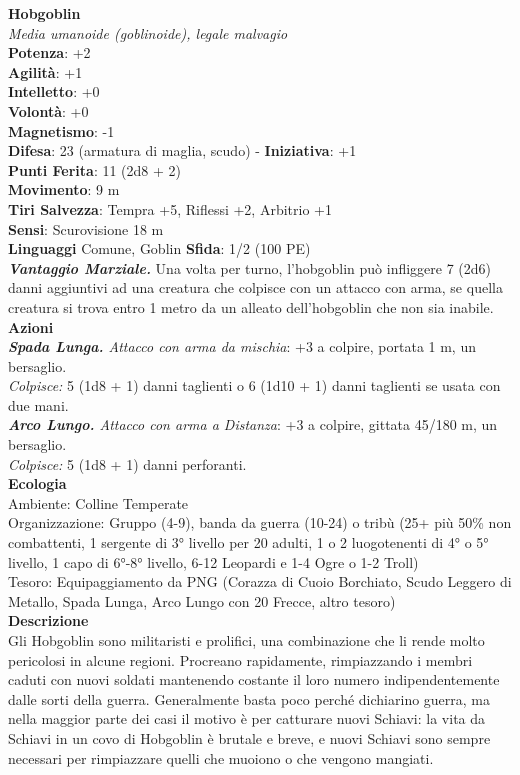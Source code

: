 \begin{multicols}{2}
\medskip\textbf{Hobgoblin}\\
\emph{Media umanoide (goblinoide), legale malvagio}\\
\textbf{Potenza}: +2\\
\textbf{Agilità}: +1\\
\textbf{Intelletto}: +0\\
\textbf{Volontà}: +0\\
\textbf{Magnetismo}: -1\\
\textbf{Difesa}: 23 (armatura di maglia, scudo) - \textbf{Iniziativa}: +1\\
\textbf{Punti Ferita}: 11 (2d8 + 2)\\
\textbf{Movimento}: 9 m\\
\textbf{Tiri Salvezza}: Tempra +5, Riflessi +2, Arbitrio +1\\
\textbf{Sensi}: Scurovisione 18 m\\
\textbf{Linguaggi} Comune, Goblin \textbf{Sfida}: 1/2 (100 PE)\smallskip\\
\emph{\textbf{Vantaggio Marziale.}} Una volta per turno, l'hobgoblin può infliggere 7 (2d6) danni aggiuntivi ad una creatura che colpisce con un attacco con arma, se quella creatura si trova entro 1 metro da un alleato dell'hobgoblin che non sia inabile.\\
\smallskip\textbf{Azioni}\\
\emph{\textbf{Spada Lunga.} Attacco con arma da mischia}: +3 a colpire, portata 1 m, un bersaglio.\\
\emph{Colpisce:} 5 (1d8 + 1) danni taglienti o 6 (1d10 + 1) danni taglienti se usata con due mani.\\
\emph{\textbf{Arco Lungo.} Attacco con arma a Distanza}: +3 a colpire, gittata 45/180 m, un bersaglio.\\
\emph{Colpisce:} 5 (1d8 + 1) danni perforanti.\\
\textbf{Ecologia}\\
Ambiente: Colline Temperate\\
Organizzazione: Gruppo (4-9), banda da guerra (10-24) o tribù (25+ più 50\% non combattenti, 1 sergente di 3° livello per 20 adulti, 1 o 2 luogotenenti di 4° o 5° livello, 1 capo di 6°-8° livello, 6-12 Leopardi e 1-4 Ogre o 1-2 Troll)\\
Tesoro: Equipaggiamento da PNG (Corazza di Cuoio Borchiato, Scudo Leggero di Metallo, Spada Lunga, Arco Lungo con 20 Frecce, altro tesoro)\\
\textbf{Descrizione}\\
Gli Hobgoblin sono militaristi e prolifici, una combinazione che li rende molto pericolosi in alcune regioni. Procreano rapidamente, rimpiazzando i membri caduti con nuovi soldati mantenendo costante il loro numero indipendentemente dalle sorti della guerra. Generalmente basta poco perché dichiarino guerra, ma nella maggior parte dei casi il motivo è per catturare nuovi Schiavi: la vita da Schiavi in un covo di Hobgoblin è brutale e breve, e nuovi Schiavi sono sempre necessari per rimpiazzare quelli che muoiono o che vengono mangiati.\\

\end{multicols}

